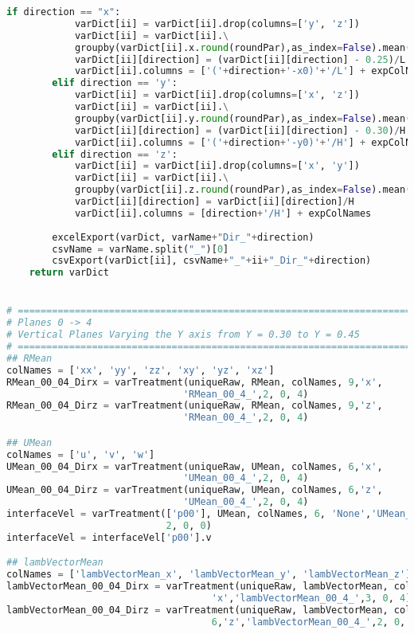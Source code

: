 \begin{lstlisting}[language=python]
        if direction == "x":
            varDict[ii] = varDict[ii].drop(columns=['y', 'z'])
            varDict[ii] = varDict[ii].\
            groupby(varDict[ii].x.round(roundPar),as_index=False).mean()
            varDict[ii][direction] = (varDict[ii][direction] - 0.25)/L
            varDict[ii].columns = ['('+direction+'-x0)'+'/L'] + expColNames
        elif direction == 'y':
            varDict[ii] = varDict[ii].drop(columns=['x', 'z'])
            varDict[ii] = varDict[ii].\
            groupby(varDict[ii].y.round(roundPar),as_index=False).mean()
            varDict[ii][direction] = (varDict[ii][direction] - 0.30)/H
            varDict[ii].columns = ['('+direction+'-y0)'+'/H'] + expColNames
        elif direction == 'z':
            varDict[ii] = varDict[ii].drop(columns=['x', 'y'])
            varDict[ii] = varDict[ii].\
            groupby(varDict[ii].z.round(roundPar),as_index=False).mean()
            varDict[ii][direction] = varDict[ii][direction]/H
            varDict[ii].columns = [direction+'/H'] + expColNames
            
        excelExport(varDict, varName+"Dir_"+direction)
        csvName = varName.split("_")[0]
        csvExport(varDict[ii], csvName+"_"+ii+"_Dir_"+direction)
    return varDict


# =============================================================================
# Planes 0 -> 4
# Vertical Planes Varying the Y axis from Y = 0.30 to Y = 0.45
# =============================================================================
## RMean
colNames = ['xx', 'yy', 'zz', 'xy', 'yz', 'xz']
RMean_00_04_Dirx = varTreatment(uniqueRaw, RMean, colNames, 9,'x',
                               'RMean_00_4_',2, 0, 4)
RMean_00_04_Dirz = varTreatment(uniqueRaw, RMean, colNames, 9,'z',
                               'RMean_00_4_',2, 0, 4)

## UMean
colNames = ['u', 'v', 'w']
UMean_00_04_Dirx = varTreatment(uniqueRaw, UMean, colNames, 6,'x',
                               'UMean_00_4_',2, 0, 4)
UMean_00_04_Dirz = varTreatment(uniqueRaw, UMean, colNames, 6,'z',
                               'UMean_00_4_',2, 0, 4)
interfaceVel = varTreatment(['p00'], UMean, colNames, 6, 'None','UMean_p00_',
                            2, 0, 0)
interfaceVel = interfaceVel['p00'].v

## lambVectorMean
colNames = ['lambVectorMean_x', 'lambVectorMean_y', 'lambVectorMean_z']
lambVectorMean_00_04_Dirx = varTreatment(uniqueRaw, lambVectorMean, colNames, 6,
                                    'x','lambVectorMean_00_4_',3, 0, 4)
lambVectorMean_00_04_Dirz = varTreatment(uniqueRaw, lambVectorMean, colNames,
                                    6,'z','lambVectorMean_00_4_',2, 0, 4)


\end{lstlisting}
